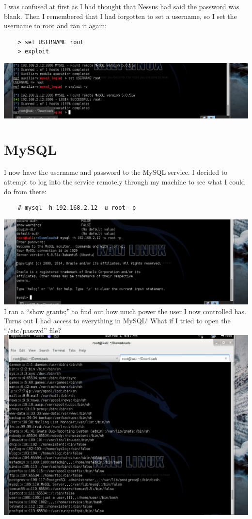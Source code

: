 \documentclass[12pt]{report}
\begin{document}
\newline
I was confused at first as I had thought that Nessus had said the password was blank. Then I remembered that I had forgotten to set a username, so I set the username to root and ran it again:
	\begin{verbatim}
	> set USERNAME root
	> exploit
	\end{verbatim}
\includegraphics[scale=0.33, width=\linewidth]{success.PNG}
\newline
\section{MySQL}
I now have the username and password to the MySQL service. I decided to attempt to log into the service remotely through my machine to see what I could do from there:
	\begin{verbatim}
	# mysql -h 192.168.2.12 -u root -p
	\end{verbatim}
\includegraphics[scale=0.33, width=\linewidth]{successful_sql_login.PNG}
\newline
I ran a ``show grants;'' to find out how much power the user I now controlled has. Turns out I had access to everything in MySQL! What if I tried to open the ``/etc/passwd'' file?\\
\includegraphics[scale=0.33, width=\linewidth]{_etc_password.PNG}
\end{document}
